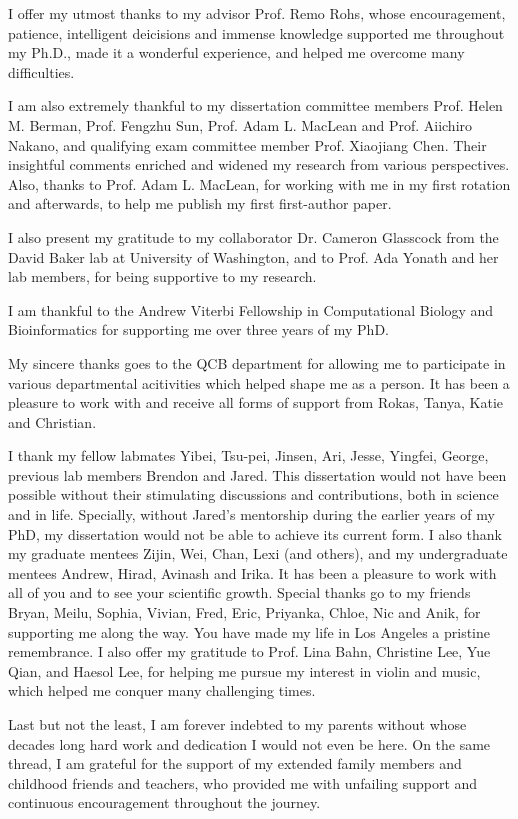 
I offer my utmost thanks to my advisor Prof. Remo Rohs, whose encouragement, patience, intelligent deicisions and immense knowledge supported me throughout my Ph.D., made it a wonderful experience, and helped me overcome many difficulties.

I am also extremely thankful to my dissertation committee members Prof. Helen M. Berman, Prof. Fengzhu Sun, Prof. Adam L. MacLean and Prof. Aiichiro Nakano, and qualifying exam committee member Prof. Xiaojiang Chen. Their insightful comments enriched and widened my research from various perspectives. Also, thanks to Prof. Adam L. MacLean, for working with me in my first rotation and afterwards, to help me publish my first first-author paper.

I also present my gratitude to my collaborator Dr. Cameron Glasscock from the David Baker lab at University of Washington, and to Prof. Ada Yonath and her lab members, for being supportive to my research. 

I am thankful to the Andrew Viterbi Fellowship in Computational Biology and Bioinformatics for supporting me over three years of my PhD.

My sincere thanks goes to the QCB department for allowing me to participate in various departmental acitivities which helped shape me as a person. It has been a pleasure to work with and receive all forms of support from Rokas, Tanya, Katie and Christian.

I thank my fellow labmates Yibei, Tsu-pei, Jinsen, Ari, Jesse, Yingfei, George, previous lab members Brendon and Jared. This dissertation would not have been possible without their stimulating discussions and contributions, both in science and in life. Specially, without Jared's mentorship during the earlier years of my PhD, my dissertation would not be able to achieve its current form. I also thank my graduate mentees Zijin, Wei, Chan, Lexi (and others), and my undergraduate mentees Andrew, Hirad, Avinash and Irika. It has been a pleasure to work with all of you and to see your scientific growth. 
Special thanks go to my friends Bryan, Meilu, Sophia, Vivian, Fred, Eric, Priyanka, Chloe, Nic and Anik, for supporting me along the way. You have made my life in Los Angeles a pristine remembrance. I also offer my gratitude to Prof. Lina Bahn, Christine Lee, Yue Qian, and Haesol Lee, for helping me pursue my interest in violin and music, which helped me conquer many challenging times.

Last but not the least, I am forever indebted to my parents without whose decades long hard work and dedication I would not even be here. On the same thread, I am grateful for the support of my extended family members and childhood friends and teachers, who provided me with unfailing support and continuous encouragement throughout the journey.